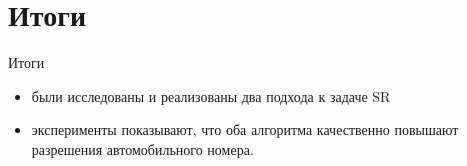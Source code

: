 \section{Итоги}

\begin{frame}{Итоги}
  \begin{itemize}
    \item были исследованы и реализованы два подхода к задаче SR
    \item эксперименты показывают, что оба алгоритма качественно повышают разрешения автомобильного
      номера.
  \end{itemize}
\end{frame}
